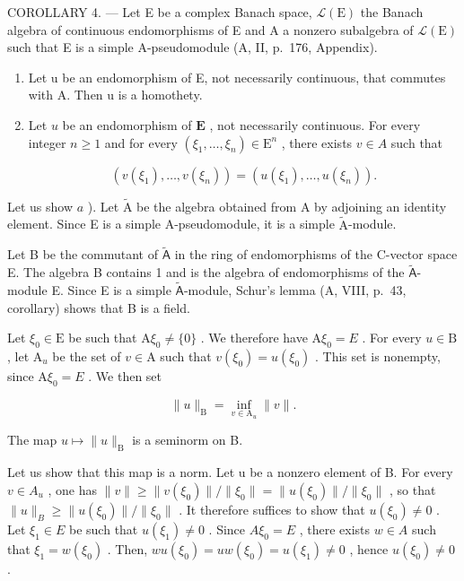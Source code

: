 COROLLARY 4. --- Let E be a complex Banach space, \(\mathcal{L}(\mathrm{E})\) the Banach algebra of continuous endomorphisms of E and A a nonzero subalgebra of \(\mathcal{L}(\mathrm{E})\) such that E is a simple A-pseudomodule (A, II, p.~176, Appendix).

\begin{enumerate}
\def\labelenumi{\alph{enumi})}
\item
  Let u be an endomorphism of E, not necessarily continuous, that commutes with A. Then u is a homothety.
\item
  Let \(u\) be an endomorphism of \(\mathbf{E}\) , not necessarily continuous. For every integer \(n \geqslant 1\) and for every \((\xi_1, \ldots, \xi_n) \in \mathrm{E}^n\) , there exists \(v \in A\) such that

\[
(v (\xi_ {1}), \dots , v (\xi_ {n})) = (u (\xi_ {1}), \dots , u (\xi_ {n})).
\]

\end{enumerate}

Let us show \(a\) ). Let \(\widetilde{\mathrm{A}}\) be the algebra obtained from A by adjoining an identity element. Since E is a simple A-pseudomodule, it is a simple \(\widetilde{\mathrm{A}}\)-module.

Let B be the commutant of \(\tilde{\mathsf{A}}\) in the ring of endomorphisms of the C-vector space E. The algebra B contains 1 and is the algebra of endomorphisms of the \(\tilde{\mathsf{A}}\)-module E. Since E is a simple \(\tilde{\mathsf{A}}\)-module, Schur's lemma (A, VIII, p.~43, corollary) shows that B is a field.

Let \(\xi_0\in \mathrm{E}\) be such that \(\mathrm{A}\xi_0\neq\{0\}\) . We therefore have \(\mathrm{A}\xi_0 = E\) . For every \(u\in \mathrm{B}\) , let \(\mathrm{A}_u\) be the set of \(v\in \mathrm{A}\) such that \(v(\xi_0) = u(\xi_0)\) . This set is nonempty, since \(\mathrm{A}\xi_0 = E\) . We then set

\[
\| u \| _ {\mathrm{B}} = \inf _ {v \in \mathrm{A} _ {u}} \| v \|.
\]

The map \(u \mapsto \|u\|_{\mathrm{B}}\) is a seminorm on B.

Let us show that this map is a norm. Let u be a nonzero element of B. For every \(v \in A_{u}\) , one has \(\|v\| \geqslant \|v(\xi_{0})\|/\|\xi_{0}\| = \|u(\xi_{0})\|/\|\xi_{0}\|\) , so that \(\|u\|_{B} \geqslant \|u(\xi_{0})\|/\|\xi_{0}\|\) . It therefore suffices to show that \(u(\xi_{0}) \neq 0\) . Let \(\xi_{1} \in E\) be such that \(u(\xi_{1}) \neq 0\) . Since \(A\xi_{0} = E\) , there exists \(w \in A\) such that \(\xi_{1} = w(\xi_{0})\) . Then, \(wu(\xi_{0}) = uw(\xi_{0}) = u(\xi_{1}) \neq 0\) , hence \(u(\xi_{0}) \neq 0\) .

